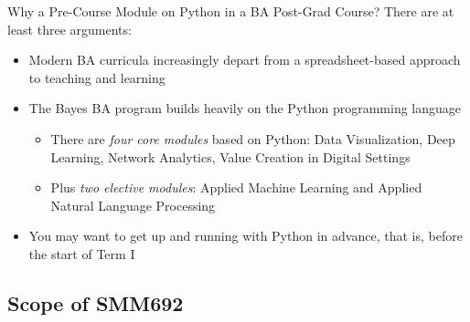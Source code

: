 \documentclass[aspectratio=1610]{beamer}
\begin{document}
\begin{frame}{Why a Pre-Course Module on Python in a BA Post-Grad Course?}
	There are at least three arguments:
	\begin{itemize}
		\item Modern BA curricula increasingly depart from a spreadsheet-based approach to teaching and learning
		\item The Bayes BA program builds heavily on the Python programming language
		\begin{itemize}
			\item There are \emph{four core modules} based on Python: Data Visualization, Deep Learning, Network Analytics, Value Creation in Digital Settings
			\item Plus \emph{two elective modules}: Applied Machine Learning and Applied Natural Language Processing
		\end{itemize}
		\item You may want to get up and running with Python in advance, that is, before the start of Term I
	\end{itemize}
\end{frame}

\subsection{Scope of SMM692}
\end{document}
